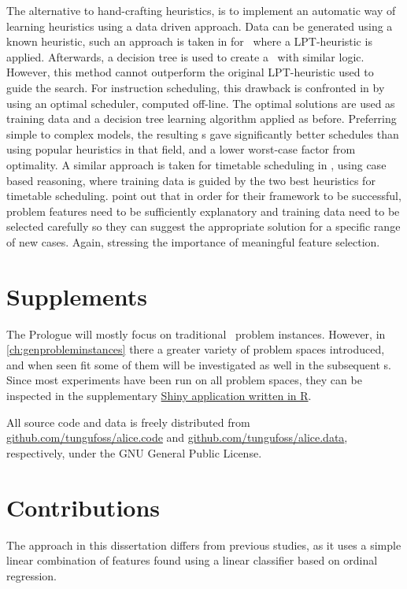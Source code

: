 The alternative to hand-crafting heuristics, is to implement an automatic way of learning heuristics using a data driven approach. %
Data can be generated using a known heuristic, such an approach is taken in 
\cite{Siggi05} for \jsp\, where a LPT-heuristic is applied. Afterwards, a 
decision tree is used to create a \dr\ with similar logic. However, this method 
cannot outperform the original LPT-heuristic used to guide the search. For 
instruction scheduling, this drawback is confronted in 
\citet{Malik08,Russell09,Siggi10} by using an optimal scheduler, computed 
off-line. The optimal solutions are used as training data and a decision tree 
learning algorithm applied as before. Preferring simple to complex models, the 
resulting \dr s gave significantly better schedules than using popular 
heuristics in that field, and a lower worst-case factor from optimality. A 
similar approach is taken for timetable scheduling in \cite{Burke06}, using 
case based reasoning, where training data is guided by the two best heuristics 
for timetable scheduling. 
\citeauthor{Burke06} point out that in order for their framework to be 
successful, problem features need to be sufficiently explanatory and training 
data need to be selected carefully so they can suggest the appropriate solution 
for a specific range of new cases. 
Again, stressing the importance of meaningful feature selection. 

\section{Supplements}
The Prologue will mostly focus on traditional \jsp\ problem instances. 
However, in \cref{ch:genprobleminstances} there a greater variety of problem 
spaces introduced, and when seen fit some of them will be investigated as well 
in the subsequent s. 
Since most experiments have been run on all problem spaces, they can be 
inspected in the supplementary \href{http://tgax89.rhi.hi.is:3838/alice}{Shiny 
application written in R}. 

All source code and data is freely distributed from 
\url{github.com/tungufoss/alice.code} and 
\url{github.com/tungufoss/alice.data}, respectively, under the GNU 
General Public License.

\section{Contributions}
The approach in this dissertation differs from previous studies, as it uses a simple linear combination of features found using a linear classifier based on ordinal regression.  

